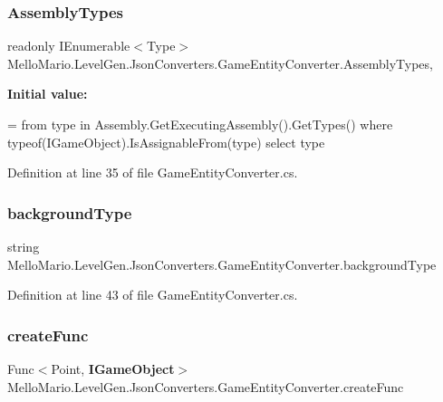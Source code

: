 \subsubsection{Assembly\+Types}
{\footnotesize\ttfamily readonly I\+Enumerable$<$Type$>$ Mello\+Mario.\+Level\+Gen.\+Json\+Converters.\+Game\+Entity\+Converter.\+Assembly\+Types\hspace{0.3cm}{\ttfamily [static]}, {\ttfamily [private]}}

{\bfseries Initial value\+:}
\begin{DoxyCode}
=
            from type in Assembly.GetExecutingAssembly().GetTypes()
            where typeof(IGameObject).IsAssignableFrom(type)
            select type
\end{DoxyCode}


Definition at line 35 of file Game\+Entity\+Converter.\+cs.

\mbox{\label{classMelloMario_1_1LevelGen_1_1JsonConverters_1_1GameEntityConverter_a1e3c41f205749766c0dfdaa66c761697}} 
\subsubsection{background\+Type}
{\footnotesize\ttfamily string Mello\+Mario.\+Level\+Gen.\+Json\+Converters.\+Game\+Entity\+Converter.\+background\+Type\hspace{0.3cm}{\ttfamily [private]}}



Definition at line 43 of file Game\+Entity\+Converter.\+cs.

\mbox{\label{classMelloMario_1_1LevelGen_1_1JsonConverters_1_1GameEntityConverter_aa5b3a7975b93560a6f4103abb6a2f578}} 
\subsubsection{create\+Func}
{\footnotesize\ttfamily Func$<$Point, \textbf{ I\+Game\+Object}$>$ Mello\+Mario.\+Level\+Gen.\+Json\+Converters.\+Game\+Entity\+Converter.\+create\+Func\hspace{0.3cm}{\ttfamily [private]}}



